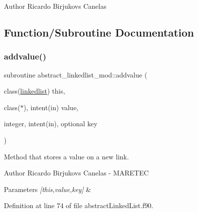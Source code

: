 \begin{DoxyAuthor}{Author}
Ricardo Birjukovs Canelas 
\end{DoxyAuthor}


\subsection{Function/\+Subroutine Documentation}
\mbox{\label{namespaceabstract__linkedlist__mod_a1075e2f234dacc9daf8407e14fac0929}} 
\subsubsection{\texorpdfstring{addvalue()}{addvalue()}}
{\footnotesize\ttfamily subroutine abstract\+\_\+linkedlist\+\_\+mod\+::addvalue (\begin{DoxyParamCaption}\item[{class(\mbox{\hyperlink{structabstract__linkedlist__mod_1_1linkedlist}{linkedlist}})}]{this,  }\item[{class($\ast$), intent(in)}]{value,  }\item[{integer, intent(in), optional}]{key }\end{DoxyParamCaption})\hspace{0.3cm}{\ttfamily [private]}}



Method that stores a value on a new link. 

\begin{DoxyAuthor}{Author}
Ricardo Birjukovs Canelas -\/ M\+A\+R\+E\+T\+EC 
\end{DoxyAuthor}

\begin{DoxyParams}{Parameters}
{\em \mbox{[}this,value,key\mbox{]}} & \\
\hline
\end{DoxyParams}


Definition at line 74 of file abstract\+Linked\+List.\+f90.


